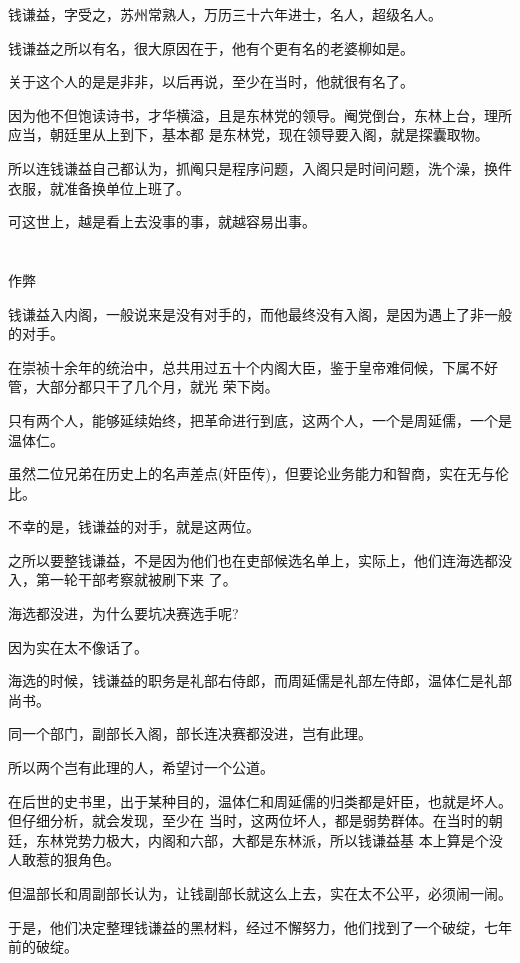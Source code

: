 \documentclass[11pt,a4paper,onecolumn]{article}
\begin{document}
钱谦益，字受之，苏州常熟人，万历三十六年进士，名人，超级名人。

钱谦益之所以有名，很大原因在于，他有个更有名的老婆\myrule 柳如是。

关于这个人的是是非非，以后再说，至少在当时，他就很有名了。

因为他不但饱读诗书，才华横溢，且是东林党的领导。阉党倒台，东林上台，理所应当，朝廷里从上到下，基本都
是东林党，现在领导要入阁，就是探囊取物。

所以连钱谦益自己都认为，抓阄只是程序问题，入阁只是时间问题，洗个澡，换件衣服，就准备换单位上班了。

可这世上，越是看上去没事的事，就越容易出事。

\section[\thesection]{}

作弊

钱谦益入内阁，一般说来是没有对手的，而他最终没有入阁，是因为遇上了非一般的对手。

在崇祯十余年的统治中，总共用过五十个内阁大臣，鉴于皇帝难伺候，下属不好管，大部分都只干了几个月，就光
荣下岗。

只有两个人，能够延续始终，把革命进行到底，这两个人，一个是周延儒，一个是温体仁。

虽然二位兄弟在历史上的名声差点(奸臣传)，但要论业务能力和智商，实在无与伦比。

不幸的是，钱谦益的对手，就是这两位。

之所以要整钱谦益，不是因为他们也在吏部候选名单上，实际上，他们连海选都没入，第一轮干部考察就被刷下来
了。

海选都没进，为什么要坑决赛选手呢?

因为实在太不像话了。

海选的时候，钱谦益的职务是礼部右侍郎，而周延儒是礼部左侍郎，温体仁是礼部尚书。

同一个部门，副部长入阁，部长连决赛都没进，岂有此理。

所以两个岂有此理的人，希望讨一个公道。

在后世的史书里，出于某种目的，温体仁和周延儒的归类都是奸臣，也就是坏人。但仔细分析，就会发现，至少在
当时，这两位坏人，都是弱势群体。在当时的朝廷，东林党势力极大，内阁和六部，大都是东林派，所以钱谦益基
本上算是个没人敢惹的狠角色。

但温部长和周副部长认为，让钱副部长就这么上去，实在太不公平，必须闹一闹。

于是，他们决定整理钱谦益的黑材料，经过不懈努力，他们找到了一个破绽，七年前的破绽。
\end{document}
